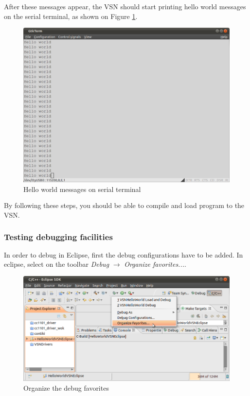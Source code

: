 \documentclass[a4paper, 10pt]{article}
\begin{document}
After these messages appear, the VSN should start printing hello world messages 
on the serial terminal, as shown on Figure \ref{fig:hello-world}.

    \begin{figure}[H]
    \centering
        \includegraphics[width=\textwidth]{./png-install-guide/hello-world.png}
        \caption{Hello world messages on serial terminal}
        \label{fig:hello-world}
    \end{figure}

By following these steps, you should be able to compile and load program to the VSN.

\subsubsection{Testing debugging facilities}

In order to debug in Eclipse, first the debug configurations have to be added.
In eclipse, select on the toolbar \emph{Debug} $\rightarrow$ \emph{Organize favorites...}.

    \begin{figure}[H]
    \centering
        \includegraphics[width=\textwidth]{./png-install-guide/debug-organize-fav.png}
        \caption{Organize the debug favorites}
        \label{fig:debug-org-fav}
    \end{figure}
\end{document}
